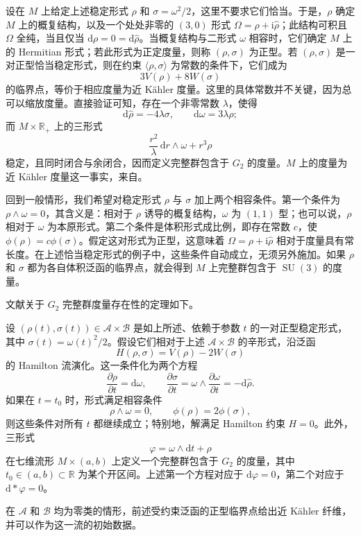 设在 $M$ 上给定上述稳定形式 $\rho$ 和 $\sigma=\omega^2/2$，这里不要求它们恰当。于是，$\rho$ 确定 $M$ 上的概复结构，以及一个处处非零的 $(3,0)$ 形式 $\Omega=\rho+\mathrm i\widehat\rho$；此结构可积且 $\Omega$ 全纯，当且仅当 $\mathrm d\rho=0=\mathrm d\widehat\rho$。当概复结构与二形式 $\omega$ 相容时，它们确定 $M$ 上的 Hermitian 形式；若此形式为正定度量，则称 $(\rho,\sigma)$ 为正型。若 $(\rho,\sigma)$ 是一对正型恰当稳定形式，则在约束 $\langle\rho,\sigma\rangle$ 为常数的条件下，它们成为
\[
3V(\rho)+8W(\sigma)
\]
的临界点，等价于相应度量为近 Kähler 度量。这里的具体常数并不关键，因为总可以缩放度量。直接验证可知，存在一个非零常数 $\lambda$，使得
\[
\mathrm d\widehat\rho=-4\lambda\sigma,
\qquad \mathrm d\omega=3\lambda\rho;
\]
而 $M\times\mathbb R_+$ 上的三形式
\[
\frac{r^2}{\lambda}\,\mathrm dr\wedge\omega+r^3\rho
\]
稳定，且同时闭合与余闭合，因而定义完整群包含于 $G_2$ 的度量。$M$ 上的度量为近 Kähler 度量这一事实，来自。

回到一般情形，我们希望对稳定形式 $\rho$ 与 $\sigma$ 加上两个相容条件。第一个条件为 $\rho\wedge\omega=0$，其含义是：相对于 $\rho$ 诱导的概复结构，$\omega$ 为 $(1,1)$ 型；也可以说，$\rho$ 相对于 $\omega$ 为本原形式。第二个条件是体积形式成比例，即存在常数 $c$，使 $\phi(\rho)=c\phi(\sigma)$。假定这对形式为正型，这意味着 $\Omega=\rho+\mathrm i\widehat\rho$ 相对于度量具有常长度。在上述恰当稳定形式的例子中，这些条件自动成立，无须另外施加。如果 $\rho$ 和 $\sigma$ 都为各自体积泛函的临界点，就会得到 $M$ 上完整群包含于 $\operatorname{SU}(3)$ 的度量。

文献关于 $G_2$ 完整群度量存在性的定理如下。
\begin{theorem*}\label{thm:7.hitchin-flow}
设 $(\rho(t),\sigma(t))\in\mathcal A\times\mathcal B$ 是如上所述、依赖于参数 $t$ 的一对正型稳定形式，其中 $\sigma(t)=\omega(t)^2/2$。假设它们相对于上述 $\mathcal A\times\mathcal B$ 的辛形式，沿泛函
\[
H(\rho,\sigma)=V(\rho)-2W(\sigma)
\]
的 Hamilton 流演化。这一条件化为两个方程
\[
\frac{\partial\rho}{\partial t}=\mathrm d\omega,
\qquad
\frac{\partial\sigma}{\partial t}
=\omega\wedge\frac{\partial\omega}{\partial t}
=-\mathrm d\widehat\rho.
\]
如果在 $t=t_0$ 时，形式满足相容条件
\[
\rho\wedge\omega=0,\qquad\phi(\rho)=2\phi(\sigma),
\]
则这些条件对所有 $t$ 都继续成立；特别地，解满足 Hamilton 约束 $H=0$。此外，三形式
\[
\varphi=\omega\wedge\mathrm dt+\rho
\]
在七维流形 $M\times(a,b)$ 上定义一个完整群包含于 $G_2$ 的度量，其中 $t_0\in(a,b)\subset\mathbb R$ 为某个开区间。上述第一个方程对应于 $\mathrm d\varphi=0$，第二个对应于 $\mathrm d*\varphi=0$。
\end{theorem*}
在 $\mathcal A$ 和 $\mathcal B$ 均为零类的情形，前述受约束泛函的正型临界点给出近 Kähler 纤维，并可以作为这一流的初始数据。

